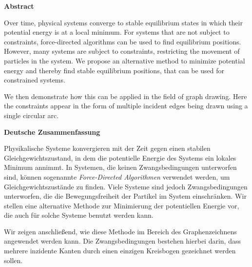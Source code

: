 \thispagestyle{plain}

\begin{addmargin}{0.5cm}

\centerline{\textbf{Abstract}}

Over time, physical systems converge to stable equilibrium states in which their potential energy is at a local minimum. For systems that are not subject to constraints, force-directed algorithms can be used to find equilibrium positions. However, many systems are subject to constraints, restricting the movement of particles in the system. We propose an alternative method to minimize potential energy and thereby find stable equilibrium positions, that can be used for constrained systems.

We then demonstrate how this can be applied in the field of graph drawing. Here the constraints appear in the form of multiple incident edges being drawn using a single circular arc.

\vskip 2cm

\centerline{\textbf{Deutsche Zusammenfassung}}

Physikalische Systeme konvergieren mit der Zeit gegen einen stabilen Gleichgewichtszustand, in dem die potentielle Energie des Systems ein lokales Minimum annimmt. In Systemen, die keinen Zwangsbedingungen unterworfen sind, können sogenannte \emph{Force-Directed Algorithmen} verwendet werden, um Gleichgewichtszustände zu finden. Viele Systeme sind jedoch Zwangsbedingungen unterworfen, die die Bewegungsfreiheit der Partikel im System einschränken. Wir stellen eine alternative Methode zur Minimierung der potentiellen Energie vor, die auch für solche Systeme benutzt werden kann.

Wir zeigen anschließend, wie diese Methode im Bereich des Graphenzeichnens angewendet werden kann. Die Zwangsbedingungen bestehen hierbei darin, dass mehrere inzidente Kanten durch einen einzigen Kreisbogen gezeichnet werden sollen.

\end{addmargin}
